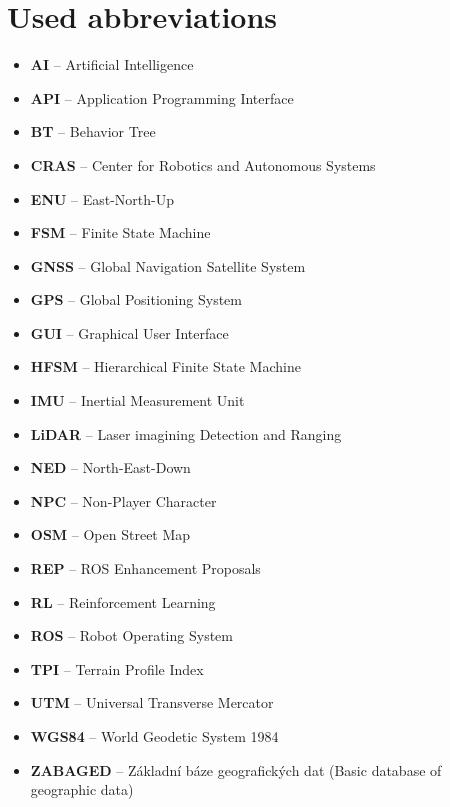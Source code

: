     \section*{Used abbreviations}
        \begin{itemize}
            \item \textbf{AI} -- Artificial Intelligence
            \item \textbf{API} -- Application Programming Interface
            \item \textbf{BT} -- Behavior Tree
            \item \textbf{CRAS} -- Center for Robotics and Autonomous Systems
            \item \textbf{ENU} -- East-North-Up
            \item \textbf{FSM} -- Finite State Machine
            \item \textbf{GNSS} -- Global Navigation Satellite System
            \item \textbf{GPS} -- Global Positioning System
            \item \textbf{GUI} -- Graphical User Interface
            \item \textbf{HFSM} -- Hierarchical Finite State Machine
            \item \textbf{IMU} -- Inertial Measurement Unit
            \item \textbf{LiDAR} -- Laser imagining Detection and Ranging
            \item \textbf{NED} -- North-East-Down
            \item \textbf{NPC} -- Non-Player Character
            \item \textbf{OSM} -- Open Street Map
            \item \textbf{REP} -- ROS Enhancement Proposals
            \item \textbf{RL} -- Reinforcement Learning
            \item \textbf{ROS} -- Robot Operating System
            \item \textbf{TPI} -- Terrain Profile Index
            \item \textbf{UTM} -- Universal Transverse Mercator
            \item \textbf{WGS84} -- World Geodetic System 1984
            \item \textbf{ZABAGED} -- Základní báze geografických dat (Basic database of geographic data)
        \end{itemize}
    